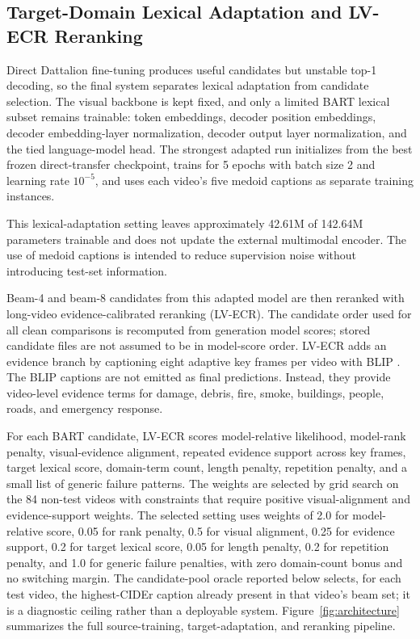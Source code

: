 \documentclass[pdflatex,sn-mathphys-num]{sn-jnl}
\theoremstyle{thmstyleone}
\theoremstyle{thmstyletwo}
\theoremstyle{thmstylethree}
\begin{document}
\subsection{Target-Domain Lexical Adaptation and LV-ECR Reranking}
Direct Dattalion fine-tuning produces useful candidates but unstable top-1 decoding, so the final system separates lexical adaptation from candidate selection. The visual backbone is kept fixed, and only a limited BART lexical subset remains trainable: token embeddings, decoder position embeddings, decoder embedding-layer normalization, decoder output layer normalization, and the tied language-model head. The strongest adapted run initializes from the best frozen direct-transfer checkpoint, trains for 5 epochs with batch size 2 and learning rate $10^{-5}$, and uses each video's five medoid captions as separate training instances.

This lexical-adaptation setting leaves approximately 42.61M of 142.64M parameters trainable and does not update the external multimodal encoder. The use of medoid captions is intended to reduce supervision noise without introducing test-set information.

Beam-4 and beam-8 candidates from this adapted model are then reranked with long-video evidence-calibrated reranking (LV-ECR). The candidate order used for all clean comparisons is recomputed from generation model scores; stored candidate files are not assumed to be in model-score order. LV-ECR adds an evidence branch by captioning eight adaptive key frames per video with BLIP \cite{li2022blip}. The BLIP captions are not emitted as final predictions. Instead, they provide video-level evidence terms for damage, debris, fire, smoke, buildings, people, roads, and emergency response.

For each BART candidate, LV-ECR scores model-relative likelihood, model-rank penalty, visual-evidence alignment, repeated evidence support across key frames, target lexical score, domain-term count, length penalty, repetition penalty, and a small list of generic failure patterns. The weights are selected by grid search on the 84 non-test videos with constraints that require positive visual-alignment and evidence-support weights. The selected setting uses weights of 2.0 for model-relative score, 0.05 for rank penalty, 0.5 for visual alignment, 0.25 for evidence support, 0.2 for target lexical score, 0.05 for length penalty, 0.2 for repetition penalty, and 1.0 for generic failure penalties, with zero domain-count bonus and no switching margin. The candidate-pool oracle reported below selects, for each test video, the highest-CIDEr caption already present in that video's beam set; it is a diagnostic ceiling rather than a deployable system. Figure~\ref{fig:architecture} summarizes the full source-training, target-adaptation, and reranking pipeline.
\end{document}
